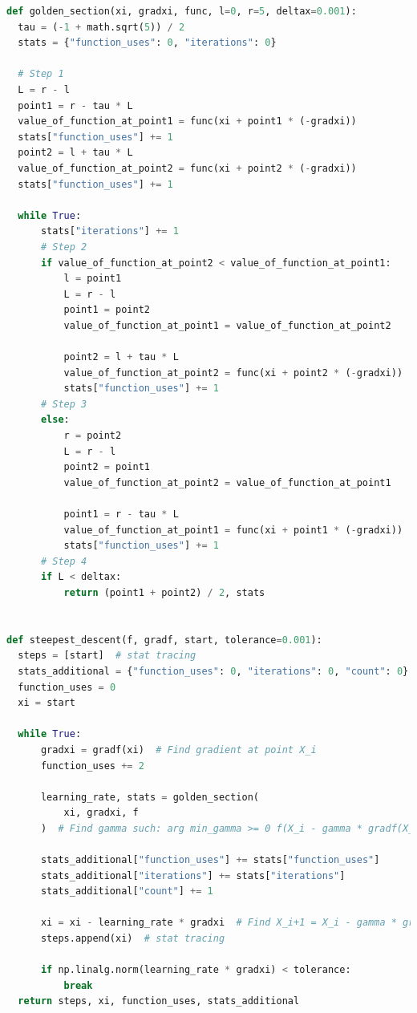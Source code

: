 \documentclass{VUMIFPSkursinis}
\begin{document}
\begin{lstlisting}[language=Python,caption={Greičiausiojo nusileidimo algoritmo realizacija su Python},label={code:steep-des}]
  def golden_section(xi, gradxi, func, l=0, r=5, deltax=0.001):
  tau = (-1 + math.sqrt(5)) / 2
  stats = {"function_uses": 0, "iterations": 0}

  # Step 1
  L = r - l
  point1 = r - tau * L
  value_of_function_at_point1 = func(xi + point1 * (-gradxi))
  stats["function_uses"] += 1
  point2 = l + tau * L
  value_of_function_at_point2 = func(xi + point2 * (-gradxi))
  stats["function_uses"] += 1

  while True:
      stats["iterations"] += 1
      # Step 2
      if value_of_function_at_point2 < value_of_function_at_point1:
          l = point1
          L = r - l
          point1 = point2
          value_of_function_at_point1 = value_of_function_at_point2

          point2 = l + tau * L
          value_of_function_at_point2 = func(xi + point2 * (-gradxi))
          stats["function_uses"] += 1
      # Step 3
      else:
          r = point2
          L = r - l
          point2 = point1
          value_of_function_at_point2 = value_of_function_at_point1

          point1 = r - tau * L
          value_of_function_at_point1 = func(xi + point1 * (-gradxi))
          stats["function_uses"] += 1
      # Step 4
      if L < deltax:
          return (point1 + point2) / 2, stats


def steepest_descent(f, gradf, start, tolerance=0.001):
  steps = [start]  # stat tracing
  stats_additional = {"function_uses": 0, "iterations": 0, "count": 0}
  function_uses = 0
  xi = start

  while True:
      gradxi = gradf(xi)  # Find gradient at point X_i
      function_uses += 2

      learning_rate, stats = golden_section(
          xi, gradxi, f
      )  # Find gamma such: arg min_gamma >= 0 f(X_i - gamma * gradf(X_i))

      stats_additional["function_uses"] += stats["function_uses"]
      stats_additional["iterations"] += stats["iterations"]
      stats_additional["count"] += 1

      xi = xi - learning_rate * gradxi  # Find X_i+1 = X_i - gamma * gradf(X_i)
      steps.append(xi)  # stat tracing

      if np.linalg.norm(learning_rate * gradxi) < tolerance:
          break
  return steps, xi, function_uses, stats_additional
\end{lstlisting}
\end{document}
